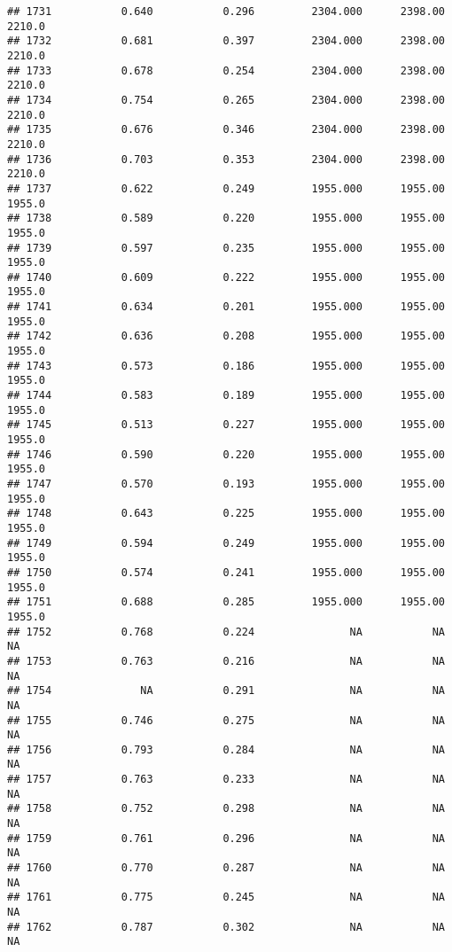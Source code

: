 \documentclass[
]{article}
\begin{document}
\begin{verbatim}
## 1731           0.640           0.296         2304.000      2398.00       2210.0
## 1732           0.681           0.397         2304.000      2398.00       2210.0
## 1733           0.678           0.254         2304.000      2398.00       2210.0
## 1734           0.754           0.265         2304.000      2398.00       2210.0
## 1735           0.676           0.346         2304.000      2398.00       2210.0
## 1736           0.703           0.353         2304.000      2398.00       2210.0
## 1737           0.622           0.249         1955.000      1955.00       1955.0
## 1738           0.589           0.220         1955.000      1955.00       1955.0
## 1739           0.597           0.235         1955.000      1955.00       1955.0
## 1740           0.609           0.222         1955.000      1955.00       1955.0
## 1741           0.634           0.201         1955.000      1955.00       1955.0
## 1742           0.636           0.208         1955.000      1955.00       1955.0
## 1743           0.573           0.186         1955.000      1955.00       1955.0
## 1744           0.583           0.189         1955.000      1955.00       1955.0
## 1745           0.513           0.227         1955.000      1955.00       1955.0
## 1746           0.590           0.220         1955.000      1955.00       1955.0
## 1747           0.570           0.193         1955.000      1955.00       1955.0
## 1748           0.643           0.225         1955.000      1955.00       1955.0
## 1749           0.594           0.249         1955.000      1955.00       1955.0
## 1750           0.574           0.241         1955.000      1955.00       1955.0
## 1751           0.688           0.285         1955.000      1955.00       1955.0
## 1752           0.768           0.224               NA           NA           NA
## 1753           0.763           0.216               NA           NA           NA
## 1754              NA           0.291               NA           NA           NA
## 1755           0.746           0.275               NA           NA           NA
## 1756           0.793           0.284               NA           NA           NA
## 1757           0.763           0.233               NA           NA           NA
## 1758           0.752           0.298               NA           NA           NA
## 1759           0.761           0.296               NA           NA           NA
## 1760           0.770           0.287               NA           NA           NA
## 1761           0.775           0.245               NA           NA           NA
## 1762           0.787           0.302               NA           NA           NA

\end{verbatim}
\end{document}
